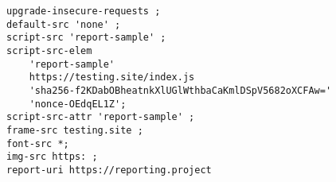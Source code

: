 \begin{verbatim}
upgrade-insecure-requests ;
default-src 'none' ;
script-src 'report-sample' ; 
script-src-elem 
	'report-sample' 
	https://testing.site/index.js 
	'sha256-f2KDabOBheatnkXlUGlWthbaCaKmlDSpV5682oXCFAw=' 
	'nonce-OEdqEL1Z'; 
script-src-attr 'report-sample' ; 
frame-src testing.site ; 
font-src *;
img-src https: ;
report-uri https://reporting.project
\end{verbatim}

